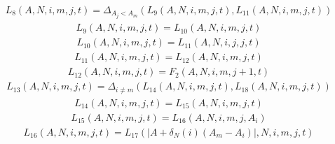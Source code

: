 \documentclass{article}
\begin{document}
\begin{equation*}\begin{split}
L_{8}\left(A,N,i,m,j,t\right) = \Delta_{A_{j} < A_{m}}\left(L_{9}\left(A,N,i,m,j,t\right),L_{11}\left(A,N,i,m,j,t\right)\right)
\end{split}\end{equation*}
\begin{equation*}\begin{split}
L_{9}\left(A,N,i,m,j,t\right) = L_{10}\left(A,N,i,m,j,t\right)
\end{split}\end{equation*}
\begin{equation*}\begin{split}
L_{10}\left(A,N,i,m,j,t\right) = L_{11}\left(A,N,i,j,j,t\right)
\end{split}\end{equation*}
\begin{equation*}\begin{split}
L_{11}\left(A,N,i,m,j,t\right) = L_{12}\left(A,N,i,m,j,t\right)
\end{split}\end{equation*}
\begin{equation*}\begin{split}
L_{12}\left(A,N,i,m,j,t\right) = F_{2}\left(A,N,i,m,j+1,t\right)
\end{split}\end{equation*}
\begin{equation*}\begin{split}
L_{13}\left(A,N,i,m,j,t\right) = \Delta_{i \ne  m}\left(L_{14}\left(A,N,i,m,j,t\right),L_{18}\left(A,N,i,m,j,t\right)\right)
\end{split}\end{equation*}
\begin{equation*}\begin{split}
L_{14}\left(A,N,i,m,j,t\right) = L_{15}\left(A,N,i,m,j,t\right)
\end{split}\end{equation*}
\begin{equation*}\begin{split}
L_{15}\left(A,N,i,m,j,t\right) = L_{16}\left(A,N,i,m,j,A_{i}\right)
\end{split}\end{equation*}
\begin{equation*}\begin{split}
L_{16}\left(A,N,i,m,j,t\right) = L_{17}\left( |A + \delta_{N}\left(i\right)\left(A_{m} - A_{i}\right)| ,N,i,m,j,t\right)
\end{split}\end{equation*}
\end{document}
